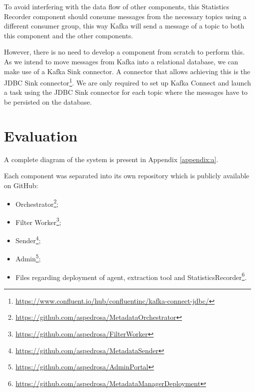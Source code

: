 To avoid interfering with the data flow of other components, this Statistics Recorder component should consume messages from the necessary topics using a different consumer group, this way Kafka will send a message of a topic to both this component and the other components.

However, there is no need to develop a component from scratch to perform this.
As we intend to move messages from Kafka into a relational database, we can make use of a Kafka Sink connector.
A connector that allows achieving this is the JDBC Sink connector\footnote{\url{https://www.confluent.io/hub/confluentinc/kafka-connect-jdbc/}}.
We are only required to set up Kafka Connect and launch a task using the JDBC Sink connector for each topic where the messages have to be persisted on the database.

\section{Evaluation}
A complete diagram of the system is present in Appendix \ref{appendix:a}.

Each component was separated into its own repository which is publicly available on GitHub:
\begin{itemize}
    \item Orchestrator\footnote{\url{https://github.com/aspedrosa/MetadataOrchestrator}};
    \item Filter Worker\footnote{\url{https://github.com/aspedrosa/FilterWorker}};
    \item Sender\footnote{\url{https://github.com/aspedrosa/MetadataSender}};
    \item Admin\footnote{\url{https://github.com/aspedrosa/AdminPortal}};
    \item Files regarding deployment of agent, extraction tool and StatisticsRecorder\footnote{\url{https://github.com/aspedrosa/MetadataManagerDeployment}}.
\end{itemize}

